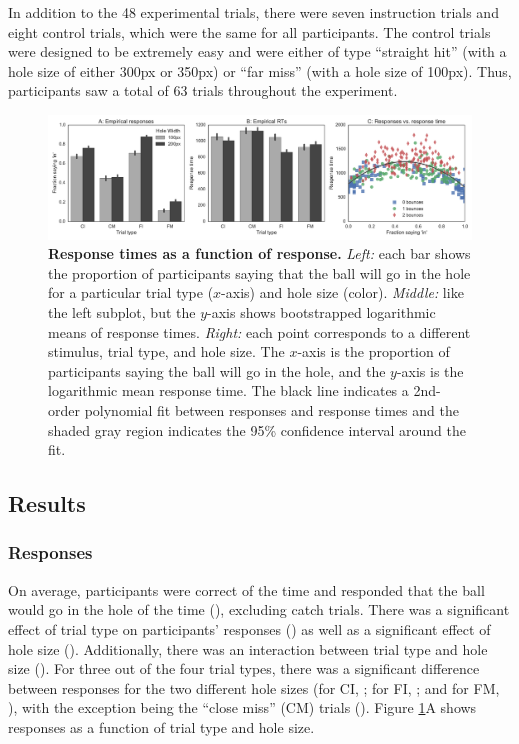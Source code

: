 \documentclass[10pt,letterpaper]{article}
\begin{document}
In addition to the 48 experimental trials, there were seven instruction trials and eight control trials, which were the same for all participants.
The control trials were designed to be extremely easy and were either of type ``straight hit'' (with a hole size of either 300px or 350px) or ``far miss'' (with a hole size of 100px).
Thus, participants saw a total of 63 trials throughout the experiment.

\begin{figure}[t]
    \begin{center}
        \includegraphics[width=\textwidth]{figures/hole_empirical_results.pdf}
        \caption{\textbf{Response times as a function of response.} \emph{Left:} each bar shows the proportion of participants saying that the ball will go in the hole for a particular trial type ($x$-axis) and hole size (color). \emph{Middle:} like the left subplot, but the $y$-axis shows bootstrapped logarithmic means of response times. \emph{Right:} each point corresponds to a different stimulus, trial type, and hole size.  The $x$-axis is the proportion of participants saying the ball will go in the hole, and the $y$-axis is the logarithmic mean response time. The black line indicates a 2nd-order polynomial fit between responses and response times and the shaded gray region indicates the 95\% confidence interval around the fit.}
        \label{fig:pct-vs-rt}
    \end{center}
\end{figure}

\subsection{Results}

\subsubsection{Responses}

On average, participants were correct \AvgCorrect{} of the time and responded that the ball would go in the hole \AvgResponse{} of the time (\ResponseN{}), excluding catch trials.
There was a significant effect of trial type on participants' responses (\ResponseHoleClass{}) as well as a significant effect of hole size (\ResponseHoleSize{}).
Additionally, there was an interaction between trial type and hole size (\ResponseFull{}).
For three out of the four trial types, there was a significant difference between responses for the two different hole sizes (for CI, \ResponseCIttest{}; for FI, \ResponseCIttest{}; and for FM, \ResponseFMttest{}), with the exception being the ``close miss'' (CM) trials (\ResponseCMttest{}).
Figure \ref{fig:pct-vs-rt}A shows responses as a function of trial type and hole size.
\end{document}

